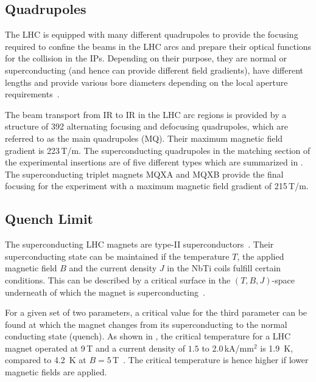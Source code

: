 \subsection{Quadrupoles}
The LHC is equipped with many different quadrupoles to provide the focusing required to confine the beams in the LHC arcs and prepare their optical functions for the collision in the IPs. Depending on their purpose, they are normal or superconducting (and hence can provide different field gradients), have different lengths and provide various bore diameters depending on the local aperture requirements~\citedr. 

The beam transport from IR to IR in the LHC arc regions is provided by a structure of 392 alternating focusing and defocusing quadrupoles, which are referred to as the main quadrupoles (MQ). Their maximum magnetic field gradient is 223\,T/m. The superconducting quadrupoles in the matching section of the experimental insertions are of five different types which are summarized in \citedr. The superconducting triplet magnets MQXA and MQXB provide the final focusing for the experiment with a maximum magnetic field gradient of 215\,T/m. 


\subsection{Quench Limit} \label{chap:quenchlim}

The superconducting LHC magnets are type-II superconductors~\cite{tinkham1996introduction}. Their superconducting state can be maintained if the temperature $T$, the applied magnetic field $B$ and the current density $J$ in the NbTi coils fulfill certain conditions. This can be described by a critical surface in the $(T,B,J)$-space underneath of which the magnet is superconducting~\cite{iwasa09}. 

For a given set of two parameters, a critical value for the third parameter can be found at which the magnet changes from its superconducting to the normal conducting state (quench). As shown in , the critical temperature for a LHC magnet operated at 9\,T and a current density of $1.5$ to 2.0\,kA/mm$^2$ is 1.9~K, compared to 4.2~K at $B=5\,$T~\cite{bruening:nature07}. The critical temperature is hence higher if lower magnetic fields are applied.

